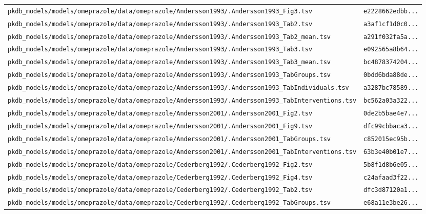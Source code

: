 \begin{longtable}{ll}
\texttt{pkdb\_models/models/omeprazole/data/omeprazole/Andersson1993/.Andersson1993\_Fig3.tsv} & \texttt{e2228662edbb...} \\
\texttt{pkdb\_models/models/omeprazole/data/omeprazole/Andersson1993/.Andersson1993\_Tab2.tsv} & \texttt{a3af1cf1d0c0...} \\
\texttt{pkdb\_models/models/omeprazole/data/omeprazole/Andersson1993/.Andersson1993\_Tab2\_mean.tsv} & \texttt{a291f032fa5a...} \\
\texttt{pkdb\_models/models/omeprazole/data/omeprazole/Andersson1993/.Andersson1993\_Tab3.tsv} & \texttt{e092565a8b64...} \\
\texttt{pkdb\_models/models/omeprazole/data/omeprazole/Andersson1993/.Andersson1993\_Tab3\_mean.tsv} & \texttt{bc4878374204...} \\
\texttt{pkdb\_models/models/omeprazole/data/omeprazole/Andersson1993/.Andersson1993\_TabGroups.tsv} & \texttt{0bdd6bda88de...} \\
\texttt{pkdb\_models/models/omeprazole/data/omeprazole/Andersson1993/.Andersson1993\_TabIndividuals.tsv} & \texttt{a3287bc78589...} \\
\texttt{pkdb\_models/models/omeprazole/data/omeprazole/Andersson1993/.Andersson1993\_TabInterventions.tsv} & \texttt{bc562a03a322...} \\
\texttt{pkdb\_models/models/omeprazole/data/omeprazole/Andersson2001/.Andersson2001\_Fig2.tsv} & \texttt{0de2b5bae4e7...} \\
\texttt{pkdb\_models/models/omeprazole/data/omeprazole/Andersson2001/.Andersson2001\_Fig9.tsv} & \texttt{dfc99cbbaca3...} \\
\texttt{pkdb\_models/models/omeprazole/data/omeprazole/Andersson2001/.Andersson2001\_TabGroups.tsv} & \texttt{c852015ec95b...} \\
\texttt{pkdb\_models/models/omeprazole/data/omeprazole/Andersson2001/.Andersson2001\_TabInterventions.tsv} & \texttt{63b3e40b01e7...} \\
\texttt{pkdb\_models/models/omeprazole/data/omeprazole/Cederberg1992/.Cederberg1992\_Fig2.tsv} & \texttt{5b8f1d8b6e05...} \\
\texttt{pkdb\_models/models/omeprazole/data/omeprazole/Cederberg1992/.Cederberg1992\_Fig4.tsv} & \texttt{c24afaad3f22...} \\
\texttt{pkdb\_models/models/omeprazole/data/omeprazole/Cederberg1992/.Cederberg1992\_Tab2.tsv} & \texttt{dfc3d87120a1...} \\
\texttt{pkdb\_models/models/omeprazole/data/omeprazole/Cederberg1992/.Cederberg1992\_TabGroups.tsv} & \texttt{e68a11e3be26...} \\

\end{longtable}
